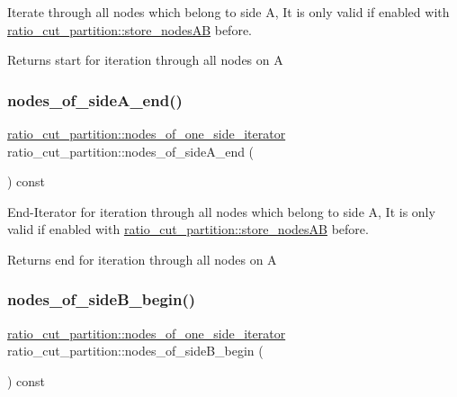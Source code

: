 Iterate through all nodes which belong to side {\ttfamily A}, It is only valid if enabled with \mbox{\hyperlink{classratio__cut__partition_af0efdeab02cb235df47e2339c196051f}{ratio\+\_\+cut\+\_\+partition\+::store\+\_\+nodes\+AB}} before.

\begin{DoxyReturn}{Returns}
start for iteration through all nodes on {\ttfamily A} 
\end{DoxyReturn}
\mbox{\label{classratio__cut__partition_a497d63a55cf326f62b97d0c77be094c7}} 
\subsubsection{\texorpdfstring{nodes\+\_\+of\+\_\+side\+A\+\_\+end()}{nodes\_of\_sideA\_end()}}
{\footnotesize\ttfamily \mbox{\hyperlink{classratio__cut__partition_a4f667099b56ded1bfef8f1fb4d09f81c}{ratio\+\_\+cut\+\_\+partition\+::nodes\+\_\+of\+\_\+one\+\_\+side\+\_\+iterator}} ratio\+\_\+cut\+\_\+partition\+::nodes\+\_\+of\+\_\+side\+A\+\_\+end (\begin{DoxyParamCaption}{ }\end{DoxyParamCaption}) const}

End-\/\+Iterator for iteration through all nodes which belong to side {\ttfamily A}, It is only valid if enabled with \mbox{\hyperlink{classratio__cut__partition_af0efdeab02cb235df47e2339c196051f}{ratio\+\_\+cut\+\_\+partition\+::store\+\_\+nodes\+AB}} before.

\begin{DoxyReturn}{Returns}
end for iteration through all nodes on {\ttfamily A} 
\end{DoxyReturn}
\mbox{\label{classratio__cut__partition_ae36c08387ff6eae1236076cdbabf4fa5}} 
\subsubsection{\texorpdfstring{nodes\+\_\+of\+\_\+side\+B\+\_\+begin()}{nodes\_of\_sideB\_begin()}}
{\footnotesize\ttfamily \mbox{\hyperlink{classratio__cut__partition_a4f667099b56ded1bfef8f1fb4d09f81c}{ratio\+\_\+cut\+\_\+partition\+::nodes\+\_\+of\+\_\+one\+\_\+side\+\_\+iterator}} ratio\+\_\+cut\+\_\+partition\+::nodes\+\_\+of\+\_\+side\+B\+\_\+begin (\begin{DoxyParamCaption}{ }\end{DoxyParamCaption}) const}

